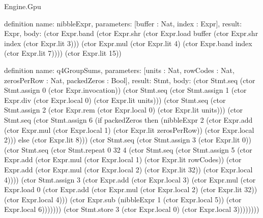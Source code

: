 \begin{lexlean}{Engine.Gpu}
\begin{semanticmodule}
definition{
  name: nibbleExpr,
  parameters: [buffer : Nat, index : Expr],
  result: Expr,
  body: (ctor Expr.band (ctor Expr.shr (ctor Expr.load buffer (ctor Expr.shr index (ctor Expr.lit 3))) (ctor Expr.mul (ctor Expr.lit 4) (ctor Expr.band index (ctor Expr.lit 7)))) (ctor Expr.lit 15))
}

definition{
  name: q4GroupSums,
  parameters: [units : Nat, rowCodes : Nat, zerosPerRow : Nat, packedZeros : Bool],
  result: Stmt,
  body: (ctor Stmt.seq (ctor Stmt.assign 0 (ctor Expr.invocation)) (ctor Stmt.seq (ctor Stmt.assign 1 (ctor Expr.div (ctor Expr.local 0) (ctor Expr.lit units))) (ctor Stmt.seq (ctor Stmt.assign 2 (ctor Expr.rem (ctor Expr.local 0) (ctor Expr.lit units))) (ctor Stmt.seq (ctor Stmt.assign 6 (if packedZeros then (nibbleExpr 2 (ctor Expr.add (ctor Expr.mul (ctor Expr.local 1) (ctor Expr.lit zerosPerRow)) (ctor Expr.local 2))) else (ctor Expr.lit 8))) (ctor Stmt.seq (ctor Stmt.assign 3 (ctor Expr.lit 0)) (ctor Stmt.seq (ctor Stmt.repeat 0 32 4 (ctor Stmt.seq (ctor Stmt.assign 5 (ctor Expr.add (ctor Expr.mul (ctor Expr.local 1) (ctor Expr.lit rowCodes)) (ctor Expr.add (ctor Expr.mul (ctor Expr.local 2) (ctor Expr.lit 32)) (ctor Expr.local 4)))) (ctor Stmt.assign 3 (ctor Expr.add (ctor Expr.local 3) (ctor Expr.mul (ctor Expr.load 0 (ctor Expr.add (ctor Expr.mul (ctor Expr.local 2) (ctor Expr.lit 32)) (ctor Expr.local 4))) (ctor Expr.sub (nibbleExpr 1 (ctor Expr.local 5)) (ctor Expr.local 6))))))) (ctor Stmt.store 3 (ctor Expr.local 0) (ctor Expr.local 3))))))))
}


\end{semanticmodule}
\end{lexlean}
